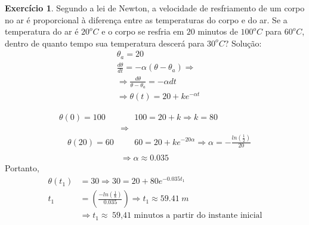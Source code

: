 \documentclass[a4paper,12pt,reqno,natbib]{amsart}
\theoremstyle{definition}
\newtheorem{exercise}{Exerc\'icio}
\begin{document}
\begin{exercise}
Segundo a lei de Newton, a velocidade de resfriamento de um corpo no ar é proporcional à diferença entre as temperaturas do corpo e do ar. Se a temperatura do ar é $20^{o}C$ e o 
corpo se resfria em $20$ minutos de $100^{o}C$ para $60^{o}C$, dentro de quanto tempo sua temperatura descerá para $30^{o}C$?
Solu\c c\~ao:
\begin{align*}
	&\theta_a = 20\\
	&\frac{d\theta}{dt} = -\alpha(\theta - {\theta_a}) \Rightarrow\\
	&\Rightarrow \frac{d\theta}{\theta - {\theta_a}} = -\alpha dt\\
	&\Rightarrow  \theta(t) = 20 + ke^{-\alpha t}
\end{align*}

{
	\setlength{\jot}{-8pt}
\begin{align*}
	\theta (0) = 100& \hspace{20pt} 100 = 20 + k \Rightarrow k = 80\\
	&\Rightarrow\\\hspace{12pt}  
	\theta (20) = 60& \hspace{20pt} 60 = 20 + ke^{-20\alpha} \Rightarrow \alpha = -\frac{ln (\frac{1}{2})}{20}\\\\
	&\Rightarrow \alpha \approx 0.035
 \end{align*}
}
Portanto,
\begin{align*}
	\theta (t_1) &= 30 \Rightarrow 30 = 20 + 80e^{-0.035t_1}\\
	t_1 &= (\frac{-ln(\frac{1}{8})}{0.035}) \Rightarrow t_1 \approx 59.41 \hspace{3pt}m \\
	&\Rightarrow \boxed{t_1 \approx \hspace{3pt} \mbox{59,41 minutos a partir do instante inicial}}
\end{align*}
\end{exercise}

\vspace{0.6 cm}
\end{document}
